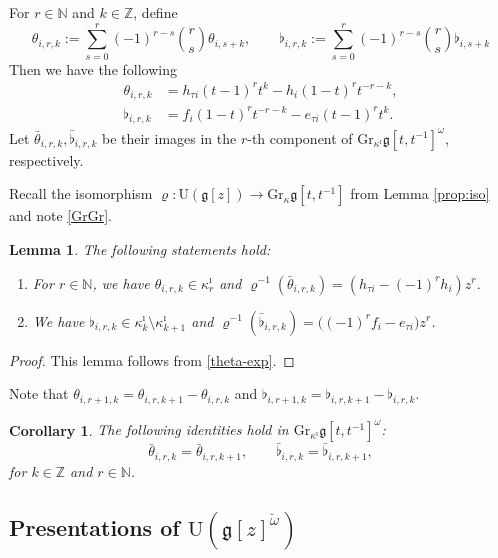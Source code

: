 \documentclass[11pt,reqno]{amsart}
\numberwithin{equation}{section}
\newtheorem{lem}[thm]{Lemma}
\newtheorem{cor}[thm]{Corollary}
\theoremstyle{definition}
\theoremstyle{remark}
\newcommand{\beq}{\begin{equation}}
\newcommand{\eeq}{\end{equation}}
\newcommand{\bN}{\mathbb{N}}
\newcommand{\g}{\mathfrak{g}}
\newcommand{\ka}{\kappa}
\newcommand{\rU}{{\mathrm{U}}}
\def \Gr{\mathrm{Gr}}
\def \N{\mathbb{N}}
\def \Z{\mathbb{Z}}
\def \hg{\mathfrak{g}[t,t^{-1}]}
\begin{document}
For $r\in\bN$ and $k\in\Z$, define
\beq\label{theta}
\theta_{i,r,k}:=\sum_{s=0}^{r}(-1)^{r-s}{r \choose s}\theta_{i,s+k},\qquad \flat_{i,r,k}:=\sum_{s=0}^r (-1)^{r-s}{r \choose s}\flat_{i,s+k}
\eeq
Then we have the following
\beq\label{theta-exp}
\begin{split}
\theta_{i,r,k}&=h_{\tau i}(t-1)^rt^k-h_{i}(1-t)^{r}t^{-r-k},\\
\flat_{i,r,k}&=f_i(1-t)^rt^{-r-k}-e_{\tau i}(t-1)^rt^k.
\end{split}
\eeq
Let $\bar{\theta}_{i,r,k},\bar{\flat}_{i,r,k}$ be their images in the $r$-th component of $\Gr_{\ka^\imath}\hg^\omega$, respectively.

Recall the isomorphism $\varrho:\rU(\g[z])\to \Gr_\ka\hg$ from Lemma \ref{prop:iso} and note \eqref{GrGr}.
\begin{lem}
The following statements hold:
\begin{enumerate}
    \item For $r\in \N$, we have  $\theta_{i,r,k}\in \ka_{r}^\imath$ and $\varrho^{-1}(\bar\theta_{i,r,k})=(h_{\tau i}-(-1)^rh_{i})z^r$.
    \item We have $\flat_{i,r,k}\in \ka_k^\imath\setminus \ka_{k+1}^\imath$ and $\varrho^{-1}(\bar\flat_{i,r,k})=\big((-1)^rf_{i}-e_{\tau i}\big)z^r$.
\end{enumerate}
\end{lem}

\begin{proof}
This lemma follows from \eqref{theta-exp}.
\end{proof}

Note that $\theta_{i,r+1,k}=\theta_{i,r,k+1}-\theta_{i,r,k}$ and $\flat_{i,r+1,k}=\flat_{i,r,k+1}-\flat_{i,r,k}$.
\begin{cor}
The following identities hold in $\Gr_{\ka^\imath}\hg^\omega$:
\[
\bar\theta_{i,r,k}=\bar\theta_{i,r,k+1},\qquad \bar\flat_{i,r,k}=\bar\flat_{i,r,k+1},
\]
for $k\in\Z$ and $r\in\N$.
\end{cor}
 
\subsection{Presentations of $\rU(\g[z]^{\check\omega})$}
\end{document}

